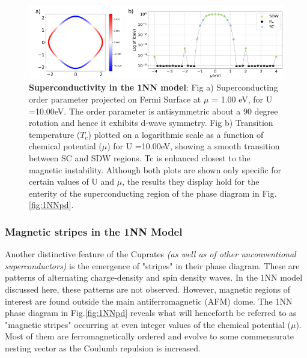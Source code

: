 \documentclass[12pt]{article}
\begin{document}
\begin{figure}[htbp]  %
    \centering
    \includegraphics[width=1.0\textwidth]{1NNSC.png}  %
    \caption{\textbf{Superconductivity in the 1NN model}:  
    Fig a) Superconducting order parameter projected on Fermi Surface at $\mu$ = 1.00 eV, 
    for U =10.00eV. The order parameter is antisymmetric about a 90 degree rotation and hence
    it exhibits d-wave symmetry. 
    Fig b) Transition temperature ($T_c$) plotted on a logarithmic scale as a function of chemical potential ($\mu$) for U =10.00eV, showing
    a smooth transition between SC and SDW regions.
    Tc is enhanced closest to the magnetic instability. 
    Although both plots are shown only specific for certain values of U and $\mu$, the results they display hold for the enterity of
    the superconducting region of the phase diagram in Fig.\ref{fig:1NNpd}.  
    }
    \label{fig:1NNSC}
\end{figure}



\subsubsection{Magnetic stripes in the 1NN Model}
\label{subsec:Stripes1NN}

Another distinctive feature of the Cuprates \textit{(as well as of other unconventional superconductors}\cite{levi1998stripes}\textit{)} is 
the emergence of "stripes" in their phase diagram. These are patterns of alternating
charge-density and spin density waves\cite{zachar1998landau, vojta2009lattice}. 
In the 1NN model discussed here, these patterns are not observed. However, magnetic regions of 
interest are found outside the main antiferromagnetic (AFM) dome. 
The 1NN phase diagram in Fig.\ref{fig:1NNpd} reveals what will henceforth be referred to as "magnetic stripes" 
occurring at even integer values of the chemical potential ($\mu$). Most of them are ferromagnetically ordered and evolve to some commensurate 
nesting vector as the Coulumb repulsion is increased.\par
\medskip
\end{document}

